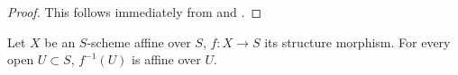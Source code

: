 \begin{proof}
\label{proof-2.1.2.4}
This follows immediately from  and .
\end{proof}

\begin{prop}[1.2.5]
\label{2.1.2.5}
Let $X$ be an $S$-scheme affine over $S$, $f:X\to S$ its structure morphism.
For every open $U\subset S$, $f^{-1}(U)$ is affine over $U$.
\end{prop}

















